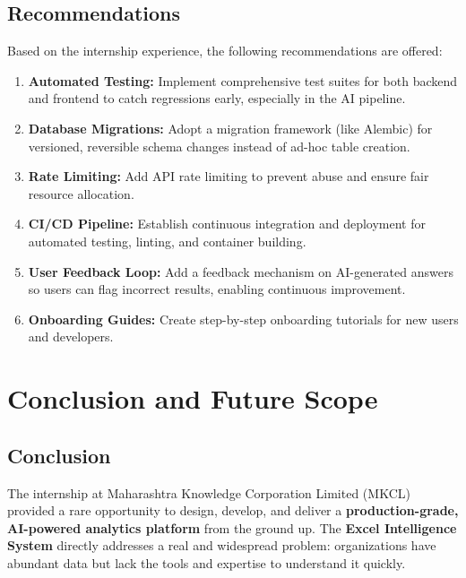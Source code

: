 \documentclass[12pt,a4paper]{report}
\begin{document}
\section{Recommendations}

Based on the internship experience, the following recommendations are offered:

\begin{enumerate}[leftmargin=1.5cm]
    \item \textbf{Automated Testing:} Implement comprehensive test suites for both backend and frontend to catch regressions early, especially in the AI pipeline.
    \item \textbf{Database Migrations:} Adopt a migration framework (like Alembic) for versioned, reversible schema changes instead of ad-hoc table creation.
    \item \textbf{Rate Limiting:} Add API rate limiting to prevent abuse and ensure fair resource allocation.
    \item \textbf{CI/CD Pipeline:} Establish continuous integration and deployment for automated testing, linting, and container building.
    \item \textbf{User Feedback Loop:} Add a feedback mechanism on AI-generated answers so users can flag incorrect results, enabling continuous improvement.
    \item \textbf{Onboarding Guides:} Create step-by-step onboarding tutorials for new users and developers.
\end{enumerate}

\chapter{Conclusion and Future Scope}

\section{Conclusion}

The internship at Maharashtra Knowledge Corporation Limited (MKCL) provided a rare opportunity to design, develop, and deliver a \textbf{production-grade, AI-powered analytics platform} from the ground up. The \textbf{Excel Intelligence System} directly addresses a real and widespread problem: organizations have abundant data but lack the tools and expertise to understand it quickly.
\end{document}
